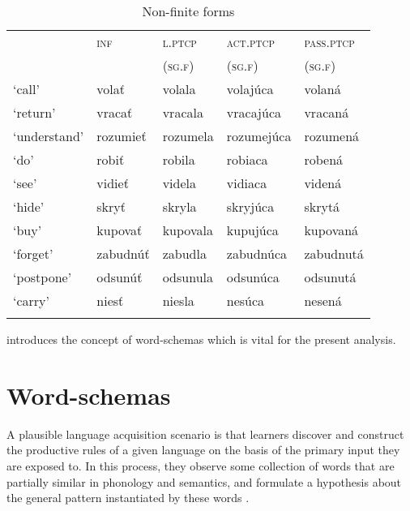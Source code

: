 \documentclass[output=paper,colorlinks,citecolor=brown,
]{langscibook}
\begin{document}
\begin{table}
\caption{Non-finite forms}
\label{tab:pitsch:4}
 \begin{tabular}{lllll}
  \lsptoprule
  & \textsc{inf} & \textsc{l.ptcp} & \textsc{act.ptcp} & \textsc{pass.ptcp} \\
  & & \textsc{(sg.f)} & \textsc{(sg.f)} & \textsc{(sg.f)} \\
  \midrule
  `call' & volať & volala & volajúca & volaná \\
  `return' & vracať & vracala & vracajúca & vracaná \\
  `understand' & rozumieť & rozumela & rozumejúca & rozumená \\
  `do' & robiť & robila & robiaca & robená \\
  `see' & vidieť & videla & vidiaca & videná \\
  `hide' & skryť & skryla & skryjúca & skrytá \\
  `buy' & kupovať & kupovala & kupujúca & kupovaná \\
  `forget' & zabudnúť & zabudla & zabudnúca & zabudnutá \\
  `postpone' & odsunúť & odsunula & odsunúca & odsunutá \\
  `carry' & niesť & niesla & nesúca & nesená \\ 
  \lspbottomrule
 \end{tabular}
\end{table}

 introduces the concept of word-schemas which is vital for the present analysis.


\section{Word-schemas}\label{sec:Schemas}

A plausible language acquisition scenario is that learners discover and construct the productive rules of a given language on the basis of the primary input they are exposed to. In this process, they observe some collection of words that are partially similar in phonology and semantics, and formulate a hypothesis about the general pattern instantiated by these words \citep[see, e.g.,][]{Haspelmath2002,Tomasello2003,Culicover.Nowak2003,HaspelmathSims2010,Jackendoff.Audring2018}.
\end{document}
